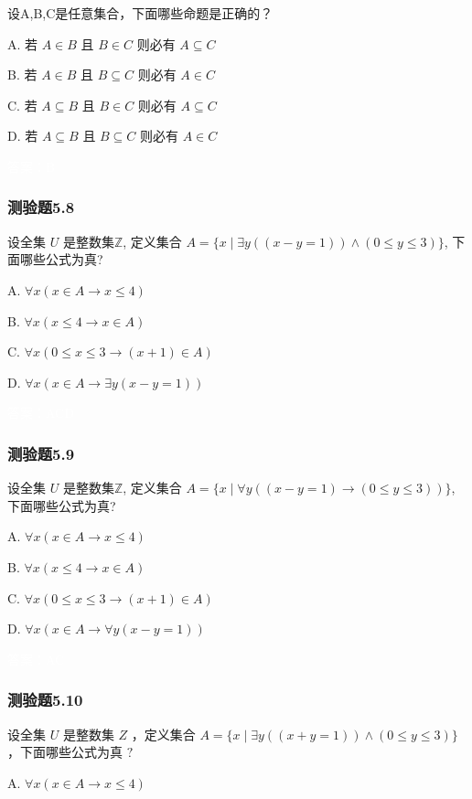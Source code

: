 \documentclass[UTF8, heading=true]{ctexart}
\begin{document}
设A,B,C是任意集合，下面哪些命题是正确的？

A. 若 $A \in B$ 且 $B \in C$ 则必有 $A \subseteq C$

B. 若 $A \in B$ 且 $B \subseteq C$ 则必有 $A \in C$

C. 若 $A \subseteq B$ 且 $B \in C$ 则必有 $A \subseteq C$

D.  若 $A \subseteq B$ 且 $B \subseteq C$ 则必有 $A \in C$

\textcolor{white}{答案：B}



\subsubsection{测验题5.8}
设全集 $U$ 是整数集$\mathbb{Z}$, 定义集合 $A=\{x \mid \exists y((x-y=1)) \wedge(0 \leq y \leq 3)\}$, 下面哪些公式为真?

A. $\forall x(x \in A \rightarrow x \leq 4)$

B. $\forall x(x \leq 4 \rightarrow x \in A)$

C. $\forall x(0 \leq x \leq 3 \rightarrow(x+1) \in A)$

D. $\forall x(x \in A \rightarrow \exists y(x-y=1))$

\textcolor{white}{答案：ACD}

\subsubsection{测验题5.9}

设全集 $U$ 是整数集$\mathbb{Z}$, 定义集合 $A=\{x \mid \forall y((x-y=1) \rightarrow(0 \leq y \leq 3))\}$, 下面哪些公式为真?

A. $\forall x(x \in A \rightarrow x \leq 4)$

B. $\forall x(x \leq 4 \rightarrow x \in A)$

C. $\forall x(0 \leq x \leq 3 \rightarrow(x+1) \in A)$

D. $\forall x(x \in A \rightarrow \forall y(x-y=1))$

\textcolor{white}{答案：AC}

\subsubsection{测验题5.10}

设全集 $U$ 是整数集 $Z$ ，定义集合 $A=\{x \mid \exists y((x+y=1)) \wedge(0 \leq y \leq 3)\}$ ，下面哪些公式为真 $?$

A. $\forall x(x \in A \rightarrow x \leq 4)$
\end{document}
